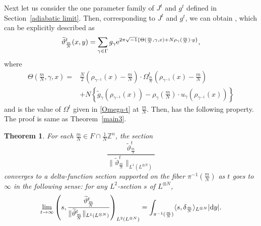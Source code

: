 \documentclass[10pt,a4paper]{amsart}
\numberwithin{equation}{section}
\newtheorem{Theorem}{Theorem}[section]
\newcommand{\Z}{\mathbb{Z}}
\renewcommand{\tilde}{\widetilde}
\newcommand{\abs}[1]{\lvert#1\rvert}
\newcommand{\norm}[1]{\lVert#1\rVert}
\begin{document}
Next let us consider the one parameter family of $J^t$ and $g^t$ defined in Section~\ref{adiabatic limit}. Then, corresponding to $J^t$ and $g^t$, we can obtain \smash{${\tilde \vartheta}_{\frac{m}{N}}^t$}, which can be explicitly described as
\begin{equation*}
{\tilde \vartheta}_{\frac{m}{N}}^t(x,y)=\sum_{\gamma\in \Gamma}g_\gamma {\rm e}^{2\pi\sqrt{-1}\{\Theta(\frac{m}{N},\gamma, x) +N\rho_\gamma (\frac{m}{N})\cdot y\}},
\end{equation*}
where
\begin{align*}
\Theta\left(\frac{m}{N}, \gamma ,x\right)={}&
\frac{N}{2}\left(\rho_{\gamma^{-1}}(x)-\frac{m}{N}\right)\cdot \Omega^t_{\frac{m}{N}}\left(\rho_{\gamma^{-1}}(x)-\frac{m}{N}\right)\\
&+N\left\{{\tilde g}_\gamma (\rho_{\gamma^{-1}}(x))-\rho_{\gamma}\left(\frac{m}{N}\right)\cdot u_\gamma (\rho_{\gamma^{-1}}(x))\right\}
\end{align*}
and  is the value of $\Omega^t$ given in \eqref{Omega-t} at $\frac{m}{N}$.
Then, \smash{${\tilde \vartheta}_{\frac{m}{N}}^t$} has the following property. The proof is same as Theorem~\ref{main3}.
\begin{Theorem}\label{main4}
For each $\frac{m}{N}\in F\cap \frac{1}{N}\Z^n$, the section
\[
 \frac{{\tilde \vartheta}^t_{\frac{m}{N}}}{\norm{{\tilde \vartheta}^t_{\frac{m}{N}}}_{L^1(L^{\otimes N})}}
 \]
 converges to a delta-function section supported on the fiber $\pi^{-1}(\frac{m}{N})$ as $t$ goes to $\infty$ in the following sense: for any $L^2$-section $s$ of $L^{\otimes N}$,
\begin{equation*}
\lim_{t\to \infty}\left(s, \frac{{\tilde \vartheta}^t_{\frac{m}{N}}}{\norm{{\tilde \vartheta}^t_{\frac{m}{N}}}_{L^1(L^{\otimes N})}}\right)_{L^2(L^{\otimes N})}
=\int_{\pi^{-1}(\frac{m}{N})}\langle s,\delta_{\frac{m}{N}}\rangle_{L^{\otimes N}} \abs{{\rm d}y}.
\end{equation*}
\end{Theorem}
\end{document}
